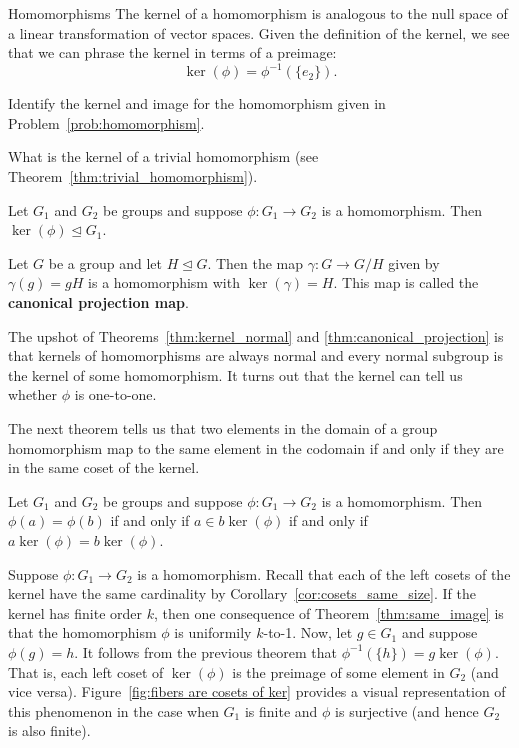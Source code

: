 \begin{section}{Homomorphisms}
The kernel of a homomorphism is analogous to the null space of a linear transformation of vector spaces.  Given the definition of the kernel, we see that we can phrase the kernel in terms of a preimage:
\[
\ker(\phi)=\phi^{-1}(\{e_2\}).
\]

\begin{problem}
Identify the kernel and image for the homomorphism given in Problem~\ref{prob:homomorphism}.
\end{problem}

\begin{problem}
What is the kernel of a trivial homomorphism (see Theorem~\ref{thm:trivial_homomorphism}).
\end{problem}

\begin{theorem}\label{thm:kernel_normal}
Let $G_1$ and $G_2$ be groups and suppose $\phi:G_1\to G_2$ is a homomorphism. Then $\ker(\phi)\trianglelefteq G_1$.
\end{theorem}

\begin{theorem}\label{thm:canonical_projection}
Let $G$ be a group and let $H\trianglelefteq G$.  Then the map $\gamma:G\to G/H$ given by $\gamma(g)=gH$ is a homomorphism with $\ker(\gamma)=H$. This map is called the \textbf{canonical projection map}.
\end{theorem}

The upshot of Theorems~\ref{thm:kernel_normal} and \ref{thm:canonical_projection} is that kernels of homomorphisms are always normal and every normal subgroup is the kernel of some homomorphism. It turns out that the kernel can tell us whether $\phi$ is one-to-one.

The next theorem tells us that two elements in the domain of a group homomorphism map to the same element in the codomain if and only if they are in the same coset of the kernel.

\begin{theorem}\label{thm:same_image}
Let $G_1$ and $G_2$ be groups and suppose $\phi:G_1\to G_2$ is a homomorphism. Then $\phi(a) = \phi(b)$ if and only if $a\in b\ker(\phi)$ if and only if $a\ker(\phi)=b\ker(\phi)$.
\end{theorem}

Suppose $\phi:G_1\to G_2$ is a homomorphism. Recall that each of the left cosets of the kernel have the same cardinality by Corollary~\ref{cor:cosets_same_size}.  If the kernel has finite order $k$, then one consequence of Theorem~\ref{thm:same_image} is that the homomorphism $\phi$ is uniformily $k$-to-1. Now, let $g\in G_1$ and suppose $\phi(g)=h$. It follows from the previous theorem that  $\phi^{-1}(\{h\})=g\ker(\phi)$.  That is, each left coset of $\ker(\phi)$ is the preimage of some element in $G_2$ (and vice versa).  Figure~\ref{fig:fibers are cosets of ker} provides a visual representation of this phenomenon in the case when $G_1$ is finite and $\phi$ is surjective (and hence $G_2$ is also finite). 


\end{section}
